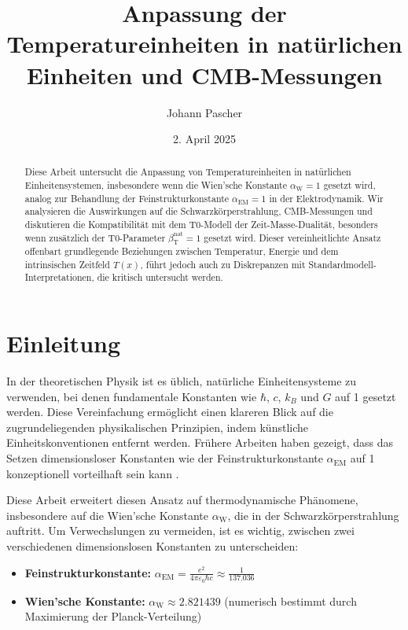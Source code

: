 \documentclass[12pt,a4paper]{article}
\newcommand{\Tfield}{T(x)}
\newcommand{\betaT}{\beta_{\text{T}}}
\newcommand{\alphaEM}{\alpha_{\text{EM}}}
\newcommand{\alphaW}{\alpha_{\text{W}}}
\begin{document}
	
	\title{Anpassung der Temperatureinheiten in natürlichen Einheiten und CMB-Messungen}
	\author{Johann Pascher}
	\date{2. April 2025}
	
	\maketitle
	
	\begin{abstract}
		Diese Arbeit untersucht die Anpassung von Temperatureinheiten in natürlichen Einheitensystemen, insbesondere wenn die Wien'sche Konstante \(\alphaW = 1\) gesetzt wird, analog zur Behandlung der Feinstrukturkonstante \(\alphaEM = 1\) in der Elektrodynamik. Wir analysieren die Auswirkungen auf die Schwarzkörperstrahlung, CMB-Messungen und diskutieren die Kompatibilität mit dem T0-Modell der Zeit-Masse-Dualität, besonders wenn zusätzlich der T0-Parameter \(\betaT^{\text{nat}} = 1\) gesetzt wird. Dieser vereinheitlichte Ansatz offenbart grundlegende Beziehungen zwischen Temperatur, Energie und dem intrinsischen Zeitfeld \(\Tfield\), führt jedoch auch zu Diskrepanzen mit Standardmodell-Interpretationen, die kritisch untersucht werden.
	\end{abstract}
	
	\tableofcontents
	\newpage
	
	\section{Einleitung}
	\label{sec:introduction}
	
	In der theoretischen Physik ist es üblich, natürliche Einheitensysteme zu verwenden, bei denen fundamentale Konstanten wie \(\hbar\), \(c\), \(k_B\) und \(G\) auf 1 gesetzt werden. Diese Vereinfachung ermöglicht einen klareren Blick auf die zugrundeliegenden physikalischen Prinzipien, indem künstliche Einheitskonventionen entfernt werden. Frühere Arbeiten haben gezeigt, dass das Setzen dimensionsloser Konstanten wie der Feinstrukturkonstante \(\alphaEM\) auf 1 konzeptionell vorteilhaft sein kann \cite{pascher_alpha_2025}.
	
	Diese Arbeit erweitert diesen Ansatz auf thermodynamische Phänomene, insbesondere auf die Wien'sche Konstante \(\alphaW\), die in der Schwarzkörperstrahlung auftritt. Um Verwechslungen zu vermeiden, ist es wichtig, zwischen zwei verschiedenen dimensionslosen Konstanten zu unterscheiden:
	
	\begin{tcolorbox}[colback=blue!5!white,colframe=blue!75!black,title=Wichtige dimensionslose Konstanten]
		\begin{itemize}
			\item \textbf{Feinstrukturkonstante:} \(\alphaEM = \frac{e^2}{4\pi\varepsilon_0 \hbar c} \approx \frac{1}{137.036}\)
			\item \textbf{Wien'sche Konstante:} \(\alphaW \approx 2.821439\) (numerisch bestimmt durch Maximierung der Planck-Verteilung)
		\end{itemize}
	\end{tcolorbox}
	
\end{document}
